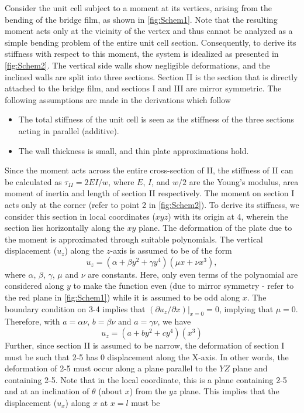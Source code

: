 \documentclass[final,a4paper,3p,times]{elsarticle}
\begin{document}
Consider the unit cell subject to a moment at its vertices, arising from the bending of the bridge film, as shown in \cref{fig:Schem1}. Note that the resulting moment acts only at the vicinity of the vertex and thus cannot be analyzed as a simple bending problem of the entire unit cell section. Consequently, to derive its stiffness with respect to this moment, the system is idealized as presented in \cref{fig:Schem2}. The vertical side walls show negligible deformations, and the inclined walls are split into three sections. Section II is the section that is directly attached to the bridge film, and sections I and III are mirror symmetric. The following assumptions are made in the derivations which follow
\begin{itemize}
    \item The total stiffness of the unit cell is seen as the stiffness of the three sections acting in parallel (additive).
    \item The wall thickness is small, and thin plate approximations hold.
\end{itemize}
Since the moment acts across the entire cross-section of II, the stiffness of II can be calculated as $\tau_{II}=2EI/w$, where $E$, $I$, and $w/2$ are the Young's modulus, area moment of inertia and length of section II respectively. The moment on section I acts only at the corner (refer to point 2 in \cref{fig:Schem2}). To derive its stiffness, we consider this section in local coordinates ($xyz$) with its origin at 4, wherein the section lies horizontally along the $xy$ plane. The deformation of the plate due to the moment is approximated through suitable polynomials. The vertical displacement ($u_z$) along the $z$-axis is assumed to be of the form
\begin{equation}
    u_z=(\alpha+\beta y^2+\gamma y^4)(\mu x + \nu x^3),
\end{equation}
where $\alpha$, $\beta$, $\gamma$, $\mu$ and $\nu$ are constants. Here, only even terms of the polynomial are considered along $y$ to make the function even (due to mirror symmetry - refer to the red plane in \cref{fig:Schem1}) while it is assumed to be odd along $x$. The boundary condition on 3-4 implies that $(\partial u_z/\partial x)|_{x=0}=0$, implying that $\mu=0$. Therefore, with $a=\alpha\nu$, $b=\beta\nu$ and $a=\gamma\nu$, we have
\begin{equation} \label{eqn:w}
    u_z=(a+b y^2 + c y^4)(x^3)
\end{equation}
Further, since section II is assumed to be narrow, the deformation of section I must be such that 2-5 has 0 displacement along the X-axis. In other words, the deformation of 2-5 must occur along a plane parallel to the $YZ$ plane and containing 2-5. Note that in the local coordinate, this is a plane containing 2-5 and at an inclination of $\theta$ (about $x$) from the $yz$ plane. This implies that the displacement ($u_x$) along $x$ at $x=l$ must be
\end{document}
